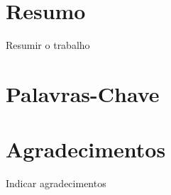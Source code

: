 \chapter{Resumo}
Resumir o trabalho

\chapter{Palavras-Chave}
\begin{acronym}[Keys]
\end{acronym}

\chapter{Agradecimentos}
Indicar agradecimentos

